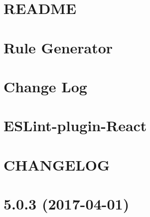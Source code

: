 \documentclass[twoside]{book}
\newcommand{\+}{\discretionary{\mbox{\scriptsize$\hookleftarrow$}}{}{}}
\begin{document}
\chapter{R\+E\+A\+D\+ME}
\label{md__c_1_workspace_demo_src_main_script_node_modules_eslint-plugin-jsx-a11y__r_e_a_d_m_e}

\chapter{Rule Generator}
\label{md__c_1_workspace_demo_src_main_script_node_modules_eslint-plugin-jsx-a11y_scripts_create-rule}

\chapter{Change Log}
\label{md__c_1_workspace_demo_src_main_script_node_modules_eslint-plugin-react__c_h_a_n_g_e_l_o_g}

\chapter{E\+S\+Lint-\/plugin-\/\+React}
\label{md__c_1_workspace_demo_src_main_script_node_modules_eslint-plugin-react__r_e_a_d_m_e}

\chapter{C\+H\+A\+N\+G\+E\+L\+OG}
\label{md__c_1_workspace_demo_src_main_script_node_modules_espree__c_h_a_n_g_e_l_o_g}

\chapter{5.0.3 (2017-\/04-\/01)}
\label{md__c_1_workspace_demo_src_main_script_node_modules_espree_node_modules_acorn__c_h_a_n_g_e_l_o_g}

\end{document}
